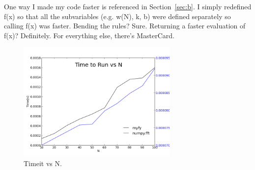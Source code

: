 \documentclass[11pt,letterpaper]{article}
\begin{document}
One way I made my code faster is referenced in Section~\ref{sec:b}. I simply redefined f(x) so that all the subvariables (e.g. w(N), k, b) were defined separately so calling f(x) was faster. Bending the rules? Sure. Returning a faster evaluation of f(x)? Definitely. For everything else, there's MasterCard.

\begin{figure}[bth]
\centering
\includegraphics[width=0.7\textwidth]{ws6fig.png}
\caption{Timeit vs N.}
\label{fig:1}
\end{figure}
\end{document}

